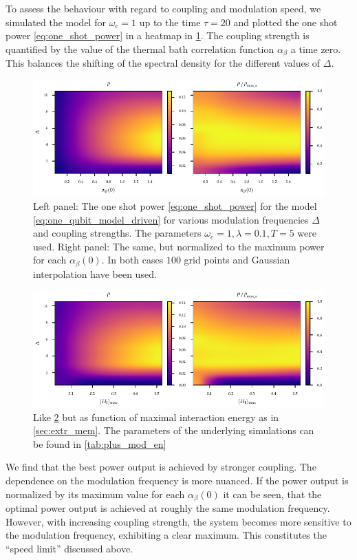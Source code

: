 To assess the behaviour with regard to coupling and modulation speed,
we simulated the model for \(ω_{c}=1\) up to the time \(τ=20\) and
plotted the one shot power \cref{eq:one_shot_power} in a heatmap in
\cref{fig:power_heatmap}. The coupling strength is quantified by the
value of the thermal bath correlation function \(α_{β}\) a time
zero. This balances the shifting of the spectral density for the
different values of \(Δ\).
\begin{figure}[htb]
  \centering
  \includegraphics{figs/one_bath_mod/power_heatmap}
  \caption{\label{fig:power_heatmap} Left panel: The one shot power
    \cref{eq:one_shot_power} for the model
    \cref{eq:one_qubit_model_driven} for various modulation
    frequencies \(Δ\) and coupling strengths. The parameters
    \(ω_{c}=1,λ=0.1, T=5\) were used. Right panel: The same, but
    normalized to the maximum power for each \(α_{β}(0)\). In both
    cases \(100\) grid points and Gaussian interpolation have been
    used.}
\end{figure}
\begin{figure}[htb]
  \centering
  \includegraphics{figs/one_bath_mod/power_en_heatmap}
  \caption{\label{fig:power_heatmap_tuned} Like
    \cref{fig:power_heatmap_tuned} but as function of maximal
    interaction energy as in \cref{sec:extr_mem}.  The parameters of
    the underlying simulations can be found in \cref{tab:plus_mod_en}}
\end{figure}

We find that the best power output is achieved by stronger
coupling. The dependence on the modulation frequency is more
nuanced. If the power output is normalized by its maximum value for
each \(α_{β}(0)\) it can be seen, that the optimal power output is
achieved at roughly the same modulation frequency. However, with
increasing coupling strength, the system becomes more sensitive to the
modulation frequency, exhibiting a clear maximum. This constitutes the
``speed limit'' discussed above.

